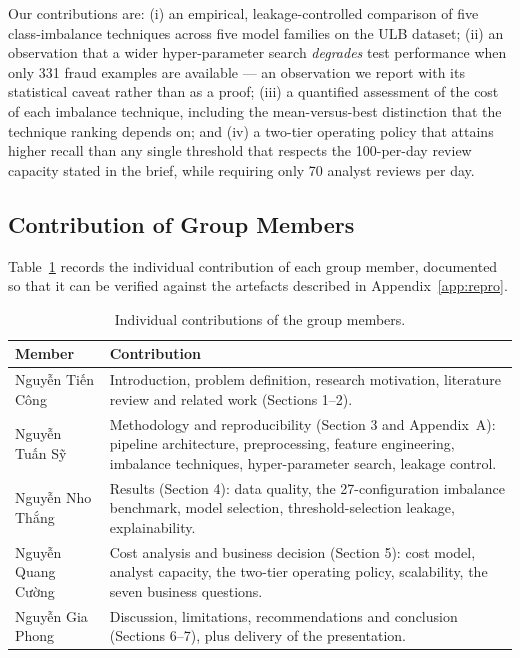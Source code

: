 Our contributions are: (i) an empirical, leakage-controlled comparison of five
class-imbalance techniques across five model families on the ULB dataset; (ii) an
observation that a wider hyper-parameter search \emph{degrades} test
performance when only 331 fraud examples are available --- an observation we
report with its statistical caveat rather than as a proof; (iii) a quantified
assessment of the cost of each imbalance technique, including the mean-versus-best
distinction that the technique ranking depends on; and (iv) a two-tier operating
policy that attains higher recall than any single threshold that respects the
100-per-day review capacity stated in the brief, while requiring only 70 analyst
reviews per day.

\subsection{Contribution of Group Members}
Table~\ref{tab:contrib} records the individual contribution of each group
member, documented so that it can be verified against the artefacts described
in Appendix~\ref{app:repro}.

\begin{table}[H]
\centering
\caption{Individual contributions of the group members.}
\label{tab:contrib}
\begin{tabular}{p{4.0cm}p{10.6cm}}
\toprule
\textbf{Member} & \textbf{Contribution} \\
\midrule
Nguyễn Tiến Công &
Introduction, problem definition, research motivation, literature review and
related work (Sections 1--2). \\
\addlinespace
Nguyễn Tuấn Sỹ &
Methodology and reproducibility (Section 3 and Appendix~A): pipeline
architecture, preprocessing, feature engineering, imbalance techniques,
hyper-parameter search, leakage control. \\
\addlinespace
Nguyễn Nho Thắng &
Results (Section 4): data quality, the 27-configuration imbalance benchmark,
model selection, threshold-selection leakage, explainability. \\
\addlinespace
Nguyễn Quang Cường &
Cost analysis and business decision (Section 5): cost model, analyst capacity,
the two-tier operating policy, scalability, the seven business questions. \\
\addlinespace
Nguyễn Gia Phong &
Discussion, limitations, recommendations and conclusion (Sections 6--7), plus
delivery of the presentation. \\
\bottomrule
\end{tabular}
\end{table}

